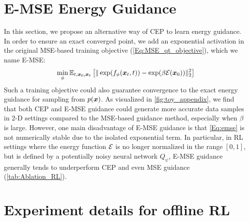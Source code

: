 \section{E-MSE Energy Guidance}
\label{sec:emse}
In this section, we propose an alternative way of CEP to learn energy guidance. In order to ensure an exact converged point, we add an exponential activation in the original MSE-based training objective (\eqref{Eq:MSE_qt_objective}), which we name E-MSE:
\begin{equation}
\label{Eq:emse}
    \min_{\phi} \mathbb{E}_{t, {\bm{x}}_0, {\bm{x}}_t} \left[
    \|\exp(f_\phi({\bm{x}}_t, t)) - \exp(\beta {\mathcal{E}}({\bm{x}}_0))\|_2^2
\right]
\end{equation}
Such a training objective could also guarantee convergence to the exact energy guidance for sampling from $p({\bm{x}})$. As visualized in \cref{fig:toy_appendix}, we find that both CEP and E-MSE guidance could generate more accurate data samples in 2-D settings compared to the MSE-based guidance method, especially when $\beta$ is large. However, one main disadvantage of E-MSE guidance is that \eqref{Eq:emse} is not numerically stable due to the isolated exponential term. In particular, in RL settings where the energy function ${\mathcal{E}}$ is no longer normalized in the range $[0, 1]$, but is defined by a potentially noisy neural network $Q_\psi$, E-MSE guidance generally tends to underperform CEP and even MSE guidance (\cref{tab:Ablation_RL}).  
\newpage
\section{Experiment details for offline RL}
\label{Sec:rl_detail}

